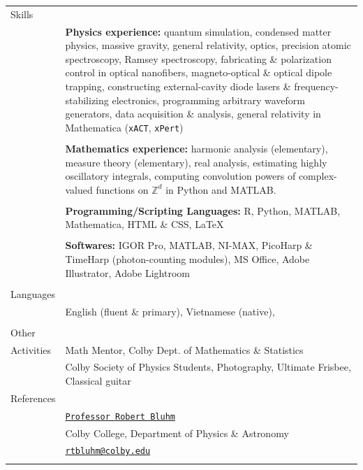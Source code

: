 \documentclass[10pt]{article}
\begin{document}
\begin{longtable}{ l p{14.7cm}   }
     					 
     					 
  
     				 	 
  
  
  						 
  						 
  \large{Skills}      	& \\ 
  						& \textbf{Physics experience:} quantum simulation, condensed matter physics, massive gravity,  general relativity, optics, precision atomic spectroscopy, Ramsey spectroscopy, fabricating \& polarization control in optical nanofibers, magneto-optical \& optical dipole trapping, constructing external-cavity diode lasers \& frequency-stabilizing electronics, programming arbitrary waveform generators, data acquisition \& analysis, general relativity in Mathematica (\texttt{xACT}, \texttt{xPert})  \\ 
  						& \\
  						& \textbf{Mathematics experience:} harmonic analysis (elementary), measure theory (elementary), real analysis, estimating highly oscillatory integrals, computing convolution powers of complex-valued functions on $\mathbb{Z}^d$ in Python and MATLAB.\\
  						& \\
  						& \textbf{Programming/Scripting Languages:} R, Python, MATLAB, Mathematica, HTML \& CSS, \LaTeX{}\\
  						& \\
  						& \textbf{Softwares:} IGOR Pro, MATLAB, NI-MAX, PicoHarp \& TimeHarp (photon-counting modules), MS Office,  Adobe Illustrator, Adobe Lightroom\\ 
  						& \\
  						 
  				

  \large{Languages}     & \\
  						& English (fluent \& primary), Vietnamese (native), \\
						& \\
  						 
  \large{Other}         & \\ 
  \large{Activities}	& Math Mentor, Colby Dept. of Mathematics \& Statistics \\
  						& Colby Society of Physics Students, Photography, Ultimate Frisbee, Classical guitar \\
  						
  						
  						


     		

  \large{References}	& \\
  						& \href{http://www.colby.edu/physics/faculty/robert.html}{\texttt{Professor Robert Bluhm}} \\
  						& Colby College, Department of Physics \& Astronomy \\
  						& {\href{mailto:rtbluhm@colby.edu}{\texttt{rtbluhm@colby.edu}}} \\
  						&  \\
  						

\end{longtable}
\end{document}
